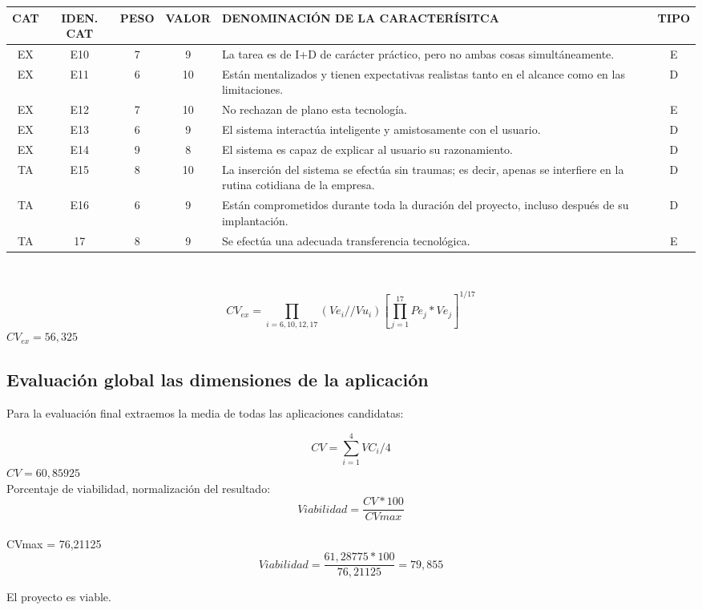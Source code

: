 \documentclass[letterpaper,12pt]{article}
\begin{document}
\begin{tabular}{|c|c|c|c|p{7.3 cm}|c|}
\hline 
CAT & IDEN. CAT & PESO & VALOR & DENOMINACIÓN DE LA CARACTERÍSITCA & TIPO \\ 
\hline 
EX & E10 & 7 & 9 & La tarea es de I+D de carácter práctico, pero no ambas cosas simultáneamente. & E \\ 
\hline 
EX & E11 & 6 & 10 & Están mentalizados y tienen expectativas realistas tanto en el alcance como en las limitaciones. & D \\ 
\hline 
EX & E12 & 7 & 10 & No rechazan de plano esta tecnología. & E \\ 
\hline 
EX & E13 & 6 & 9 & El sistema interactúa inteligente y amistosamente con el usuario. & D \\ 
\hline 
EX & E14 & 9 & 8 & El sistema es capaz de explicar al usuario su razonamiento. & D \\ 
\hline 
TA & E15 & 8 & 10 & La inserción del sistema se efectúa sin traumas; es decir, apenas se interfiere en la rutina cotidiana de la empresa. & D \\ 
\hline 
TA & E16 & 6 & 9 & Están comprometidos durante toda la duración del proyecto, incluso después de su implantación. & D \\ 
\hline 
TA & 17 & 8 & 9 & Se efectúa una adecuada transferencia tecnológica. & E \\ 
\hline 
\end{tabular} \\
\begin{center}
\[
CV_{ex} = \prod_{i=6,10,12,17}(Ve_{i}//Vu_{i})[\prod_{j=1}^{17}Pe_{j}*Ve_{j}]^{1/17}
\]
$CV_{ex} = 56,325$
\end{center}
\newpage
\subsection{Evaluación global las dimensiones de la aplicación}
Para la evaluación final extraemos la media de todas las aplicaciones candidatas: 
\begin{center}
\[
CV = \sum_{i=1}^{4}VC_{i}/4
\]
$CV = 60,85925$
\\
Porcentaje de viabilidad, normalización del resultado:
\begin{equation}
 \textit{Viabilidad} = \dfrac{CV*100}{CVmax} 
 \end{equation}\\

 CVmax = 76,21125 
 \begin{equation}
 \textit{Viabilidad} = \dfrac{61,28775*100}{76,21125} = 79,855 %
\end{equation}

\end{center}

El proyecto es viable.
\end{document}
